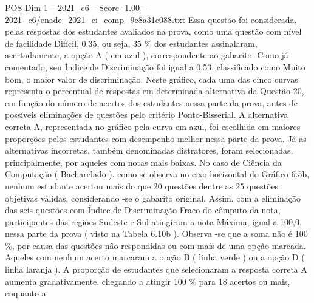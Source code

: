 \begin{textsample}{POS Dim 1 – 2021\_c6 – Score -1.00 – 2021\_c6/enade\_2021\_ci\_comp\_9c8a31e088.txt}
Essa questão foi considerada, pelas respostas dos estudantes avaliados na prova, como uma questão com nível de facilidade Difícil, 0,35, ou seja, 35 \% dos estudantes assinalaram, acertadamente, a opção A ( em azul ), correspondente ao gabarito.
Como já comentado, seu Índice de Discriminação foi igual a 0,53, classificado como Muito bom, o maior valor de discriminação.
Neste gráfico, cada uma das cinco curvas representa o percentual de respostas em determinada alternativa da Questão 20, em função do número de acertos dos estudantes nessa parte da prova, antes de possíveis eliminações de questões pelo critério Ponto-Bisserial.
A alternativa correta A, representada no gráfico pela curva em azul, foi escolhida em maiores proporções pelos estudantes com desempenho melhor nessa parte da prova.
Já as alternativas incorretas, também denominadas distratores, foram selecionadas, principalmente, por aqueles com notas mais baixas.
No caso de Ciência da Computação ( Bacharelado ), como se observa no eixo horizontal do Gráfico 6.5b, nenhum estudante acertou mais do que 20 questões dentre as 25 questões objetivas válidas, considerando -se o gabarito original.
Assim, com a eliminação das seis questões com Índice de Discriminação Fraco do cômputo da nota, participantes das regiões Sudeste e Sul atingiram a nota Máxima, igual a 100,0, nessa parte da prova ( visto na Tabela 6.10b ).
Observa -se que a soma não é 100 \%, por causa das questões não respondidas ou com mais de uma opção marcada.
Aqueles com nenhum acerto marcaram a opção B ( linha verde ) ou a opção D ( linha laranja ).
A proporção de estudantes que selecionaram a resposta correta A aumenta gradativamente, chegando a atingir 100 \% para 18 acertos ou mais, enquanto a

\end{textsample}

